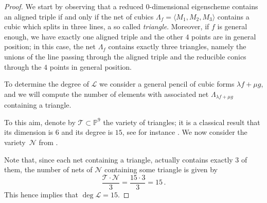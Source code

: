 \documentclass[12pt, a4paper, reqno, captions=tableheading,bibliography=totoc]{scrartcl}
\theoremstyle{plain}
\theoremstyle{definition}
\newcommand{\p}{\mathbb{P}}
\newcommand{\comment}[1]{}
\begin{document}
\begin{proof}
We start by observing that a reduced $0$-dimensional eigenscheme contains an aligned triple if and only if the net of cubics $\Lambda_f = \langle M_1, M_2, M_3 \rangle$ contains a cubic which splits in three lines, a so called \emph{triangle}. Moreover, if $f$ is general enough, we have exactly one aligned triple and the other $4$ points are in general position; in this case, the net $\Lambda_f$ contains exactly three triangles, namely the unions of the line passing through the aligned triple and the reducible conics through the $4$ points in general position.

To determine the degree of $\mathcal L$ we consider a general pencil of cubic forms $\lambda f + \mu g$, and we will compute the number of elements with associated net $\Lambda_{\lambda f + \mu g}$ containing a triangle.

To this aim, denote by ${\mathcal T} \subset \p^9$ the variety of triangles; it is a classical result that its dimension is $6$ and its degree is $15$,
see for instance \cite[Section 2.2.2]{3264}. We now consider the variety~${\mathcal N}$ from .
\comment{
given by the union of the nets of cubics of the pencil
$$
{\mathcal N} = \bigcup_{(\lambda : \mu) \in \p^1} \Lambda_{\lambda f + \mu g} \subset \p^9.
$$
Observe that we can assume that ${\mathcal N}$ is an embedding of a rational projective bundle; indeed, it can be seen as an immersion of the $\p^2$-bundle over $\p^1$ given by the family the planes ${\mathcal P}=
\{\Lambda_{\lambda f + \mu g}\ : \ (\lambda:\mu)\in \p^1\} \subset \p^1 \times \p^9$. The map ${\mathcal P} \to {\mathcal N}$ contracts no subvariety of any plane of ${\mathcal P}$, so it is either an embedding or it contracts some horizontal curve. In the latter case, all the planes of the family should intersect in at least one point. In particular, the two nets $\Lambda_f$ and $\Lambda_g$ should have non-empty intersection.
If we denote by $M_1$, $M_2$ and $M_3$ the $2 \times 2$ minors relative to $f$, and by $N_1$, $N_2$ and $N_3$ the ones relative to $g$, the vectorial dimension of the linear span
$\langle M_1,M_2,M_3,N_1,N_2,N_3
\rangle$ should be strictly less than $6$. This can be avoided, since such a condition corresponds to a proper closed subscheme of $\p^9 \times \p^9$.

It follows that if ${\mathcal N}$ is general enough, it is a $3$-dimensional rational normal scroll in $\p(\langle M_1,M_2,M_3,N_1,N_2,N_3
\rangle) \cong \p^5$, and being a variety of minimal degree, its degree is $\deg {\mathcal N}=5+1-3=3$.
}
Note that, since each net containing a triangle, actually contains exactly $3$ of them, the number of nets of ${\mathcal N}$ containing some triangle is given by
%
\[
\frac {{\mathcal T} \cdot {\mathcal N}}{3} =\frac{{15} \cdot {3}}{3}=15 \,.
\]
%
This hence implies that $\deg {\mathcal L} = 15$.
\end{proof}
\end{document}
